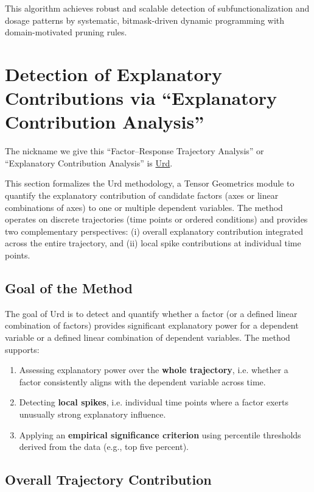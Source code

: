 \documentclass{article}
\begin{document}
\noindent
This algorithm achieves robust and scalable detection of subfunctionalization and dosage patterns by systematic, bitmask-driven dynamic programming with domain-motivated pruning rules.

\section{Detection of Explanatory Contributions via ``Explanatory Contribution Analysis''}

The nickname we give this ``Factor–Response Trajectory Analysis'' or
``Explanatory Contribution Analysis'' is
\href{https://en.wikipedia.org/wiki/Ur\%C3\%B0r}{Urd}.

This section formalizes the Urd methodology, a Tensor Geometrics module to quantify the explanatory contribution of candidate factors (axes or linear combinations of axes) to one or multiple dependent variables. The method operates on discrete trajectories (time points or ordered conditions) and provides two complementary perspectives: (i) overall explanatory contribution integrated across the entire trajectory, and (ii) local spike contributions at individual time points.

\subsection{Goal of the Method}

The goal of Urd is to detect and quantify whether a factor (or a defined linear combination of factors) provides significant explanatory power for a dependent variable or a defined linear combination of dependent variables. The method supports:
\begin{enumerate}
    \item Assessing explanatory power over the \textbf{whole trajectory}, i.e. whether a factor consistently aligns with the dependent variable across time.
    \item Detecting \textbf{local spikes}, i.e. individual time points where a factor exerts unusually strong explanatory influence.
    \item Applying an \textbf{empirical significance criterion} using percentile thresholds derived from the data (e.g., top five percent).
\end{enumerate}

\subsection{Overall Trajectory Contribution}
\end{document}
